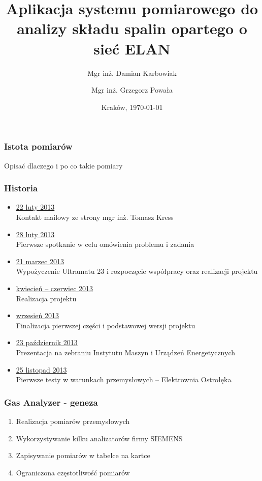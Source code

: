 \documentclass[ucs]{beamer}
\title[Gas Analyzer]{Aplikacja systemu pomiarowego do analizy składu spalin opartego o sieć ELAN}
\author[D. Karbowiak, G. Powała]{Mgr inż. Damian Karbowiak  \and Mgr inż. Grzegorz Powała}
\institute[Politechnika Śl.]{\large Politechnika Śląska \\\vspace{0.5cm} \texttt{[image: images/PolslLogo]} }
\date{Kraków, \today}
\begin{document}
\begin{frame}
  \titlepage
\end{frame}

\begin{frame}
\frametitle{Istota pomiarów}
Opisać dlaczego i po co takie pomiary
\end{frame}

\begin{frame}
\frametitle{Historia}
\vspace{-2mm}
\begin{itemize}
\setlength{\itemsep}{0pt}
\setlength{\parskip}{0pt}
\setlength{\parsep}{0pt}
\item \underline{22 luty 2013} \\
Kontakt mailowy ze strony mgr inż. Tomasz Kress
\item \underline{28 luty 2013} \\
Pierwsze spotkanie w celu omówienia problemu i zadania
\item \underline{21 marzec 2013} \\
Wypożyczenie Ultramatu 23 i rozpoczęcie współpracy oraz realizacji projektu
\item \underline{kwiecień -- czerwiec 2013} \\
Realizacja projektu
\item \underline{wrzesień 2013} \\
Finalizacja pierwszej części i podstawowej wersji projektu
\item \underline{23 październik 2013} \\
Prezentacja na zebraniu Instytutu Maszyn i Urządzeń Energetycznych
\item \underline{25 listopad 2013} \\
Pierwsze testy w warunkach przemysłowych -- Elektrownia Ostrołęka
\end{itemize}
\end{frame}

\begin{frame}
\frametitle{Gas Analyzer - geneza}
\begin{enumerate}
\setlength{\itemsep}{5pt}
\setlength{\parskip}{5pt}
\setlength{\parsep}{5pt}
\item Realizacja pomiarów przemysłowych
\item Wykorzystywanie kilku analizatorów firmy SIEMENS
\item Zapisywanie pomiarów w tabelce na kartce
\item Ograniczona częstotliwość pomiarów
\end{enumerate}
\end{frame}
\end{document}
